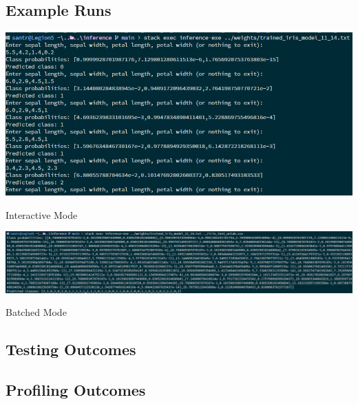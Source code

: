 \documentclass[12pt, titlepage]{article}
\begin{document}
\subsection{Example Runs}
{
	\begin{center}
		\includegraphics[width=\textwidth]{../images/examples.png}
	\end{center}
	\begin{center}
		Interactive Mode
	\end{center}
	\begin{center}
		\includegraphics[width=\textwidth]{../images/examplebatch.png}
	\end{center}
	\begin{center}
		Batched Mode
	\end{center}
}

\subsection{Testing Outcomes}

\subsection{Profiling Outcomes}
\end{document}
